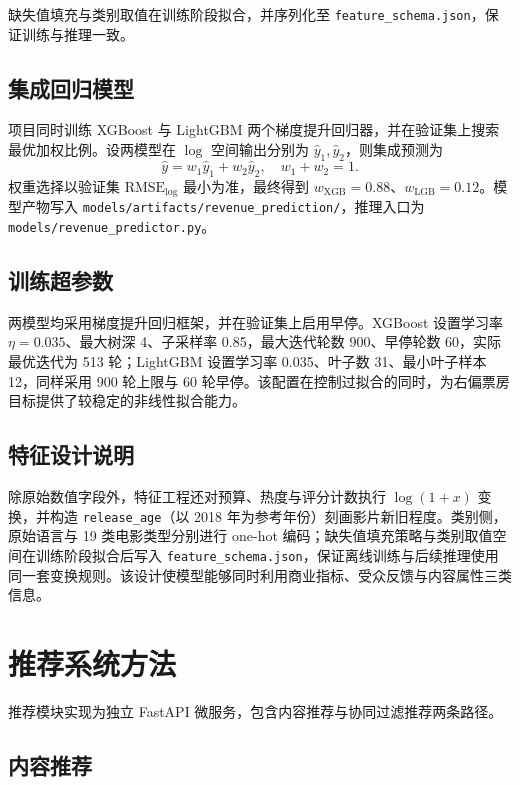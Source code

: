 缺失值填充与类别取值在训练阶段拟合，并序列化至 \texttt{feature\_schema.json}，保证训练与推理一致。

\subsection{集成回归模型}

项目同时训练 XGBoost 与 LightGBM 两个梯度提升回归器，并在验证集上搜索最优加权比例。设两模型在 $\log$ 空间输出分别为 $\hat{y}_1,\hat{y}_2$，则集成预测为
\begin{equation}
    \hat{y} = w_1 \hat{y}_1 + w_2 \hat{y}_2, \quad w_1 + w_2 = 1.
    \label{eq:ensemble}
\end{equation}
权重选择以验证集 $\text{RMSE}_{\log}$ 最小为准，最终得到 $w_{\text{XGB}}=0.88$、$w_{\text{LGB}}=0.12$。模型产物写入 \texttt{models/artifacts/revenue\_prediction/}，推理入口为 \texttt{models/revenue\_predictor.py}。

\subsection{训练超参数}

两模型均采用梯度提升回归框架，并在验证集上启用早停。XGBoost 设置学习率 $\eta=0.035$、最大树深 4、子采样率 0.85，最大迭代轮数 900、早停轮数 60，实际最优迭代为 513 轮；LightGBM 设置学习率 0.035、叶子数 31、最小叶子样本 12，同样采用 900 轮上限与 60 轮早停。该配置在控制过拟合的同时，为右偏票房目标提供了较稳定的非线性拟合能力。

\subsection{特征设计说明}

除原始数值字段外，特征工程还对预算、热度与评分计数执行 $\log(1+x)$ 变换，并构造 \texttt{release\_age}（以 2018 年为参考年份）刻画影片新旧程度。类别侧，原始语言与 19 类电影类型分别进行 one-hot 编码；缺失值填充策略与类别取值空间在训练阶段拟合后写入 \texttt{feature\_schema.json}，保证离线训练与后续推理使用同一套变换规则。该设计使模型能够同时利用商业指标、受众反馈与内容属性三类信息。

\section{推荐系统方法}
\label{sec:method:recommendation}

推荐模块实现为独立 FastAPI 微服务，包含内容推荐与协同过滤推荐两条路径。

\subsection{内容推荐}

